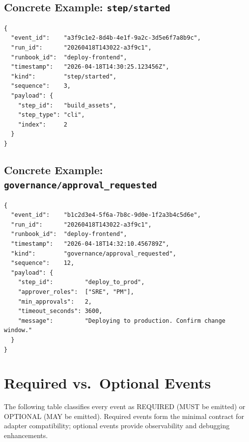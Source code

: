 \subsection{Concrete Example: \texttt{step/started}}

\begin{verbatim}
{
  "event_id":    "a3f9c1e2-8d4b-4e1f-9a2c-3d5e6f7a8b9c",
  "run_id":      "20260418T143022-a3f9c1",
  "runbook_id":  "deploy-frontend",
  "timestamp":   "2026-04-18T14:30:25.123456Z",
  "kind":        "step/started",
  "sequence":    3,
  "payload": {
    "step_id":   "build_assets",
    "step_type": "cli",
    "index":     2
  }
}
\end{verbatim}

\subsection{Concrete Example: \texttt{governance/approval\_requested}}

\begin{verbatim}
{
  "event_id":    "b1c2d3e4-5f6a-7b8c-9d0e-1f2a3b4c5d6e",
  "run_id":      "20260418T143022-a3f9c1",
  "runbook_id":  "deploy-frontend",
  "timestamp":   "2026-04-18T14:32:10.456789Z",
  "kind":        "governance/approval_requested",
  "sequence":    12,
  "payload": {
    "step_id":         "deploy_to_prod",
    "approver_roles":  ["SRE", "PM"],
    "min_approvals":   2,
    "timeout_seconds": 3600,
    "message":         "Deploying to production. Confirm change window."
  }
}
\end{verbatim}

\section{Required vs.\ Optional Events}

The following table classifies every event as REQUIRED (MUST be emitted) or OPTIONAL (MAY be emitted). Required events form the minimal contract for adapter compatibility; optional events provide observability and debugging enhancements.

